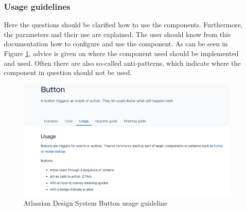 \subsubsection{Usage guidelines} Here the questions should be clarified how to use the components. Furthermore, the parameters and their use are explained. The user should know from this documentation how to configure and use the component. \cite{vesselov_building_2019} As can be seen in Figure \ref{atlassian_button}, advice is given on where the component used should be implemented and used. Often there are also so-called anti-patterns, which indicate where the component in question should not be used.
\begin{figure}[htb]
\centerline{\includegraphics[width=\linewidth]{images/atlassian_button_usage.png}}
\caption{Atlassian Design System Button usage guideline \cite{atlassian_design_system_atlassian_nodate}}
\label{atlassian_button}
\end{figure}
